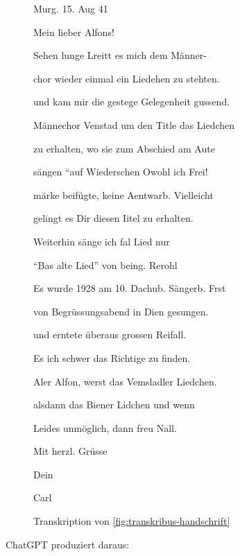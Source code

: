 \documentclass[12pt, a4paper, ngerman, bidi=default]{article}
\begin{document}
  \begin{figure}[htbp]
  \centering
  \begin{tcolorbox}[colback=oldLetter, colframe=black, sharp corners, width=\textwidth]
    Murg. 15. Aug 41 

    
    Mein lieber Alfons! 

    Sehen lunge Lreitt es mich dem Männer- 

    chor wieder einmal ein Liedehen zu stehten. 

    und kam mir die gestege Gelegenheit gussend. 

    Männechor Venstad um den Title das Liedchen 

    zu erhalten, wo sie zum Abschied am Aute 

    sängen ``auf Wiederschen Owohl ich Frei! 

    märke beifügte, keine Aentwarb. Vielleicht 

    gelingt es Dir diesen Iitel zu erhalten. 
    
    Weiterhin sänge ich fal Lied nur 
    
    ``Bas alte Lied'' von being. Rerohl 

    Es wurde 1928 am 10. Dachub. Sängerb. Frst 

    von Begrüssungsabend in Dien gesungen. 

    und erntete überaus grossen Reifall. 

    Es ich schwer das Richtige zu finden. 

    Aler Alfon, werst das Vemsladler Liedchen. 

    alsdann das Biener Lidchen und wenn 

    Leides unmöglich, dann freu Nall. 

    Mit herzl. Grüsse 

    Dein 

    Carl 
  \end{tcolorbox}
  \caption{Transkription von \autoref{fig:transkribus-handschrift}}
  \label{fig:transkription-brief}

\end{figure}

ChatGPT produziert daraus:
\end{document}
